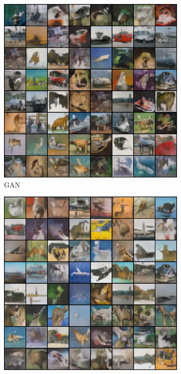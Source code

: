 \begin{figure}[htbp]
    \centering
    \begin{subfigure}[b]{0.49\textwidth}
       \centering
       \includegraphics[width=\exfactor\textwidth]{figures/cifar/192_base_raw_base.png}
       \caption{GAN}
    \end{subfigure}
    \begin{subfigure}[b]{0.49\textwidth}
       \centering
       \includegraphics[width=\exfactor\textwidth]{figures/cifar/192_base_raw_reject.png}

\end{subfigure}
\end{figure}
